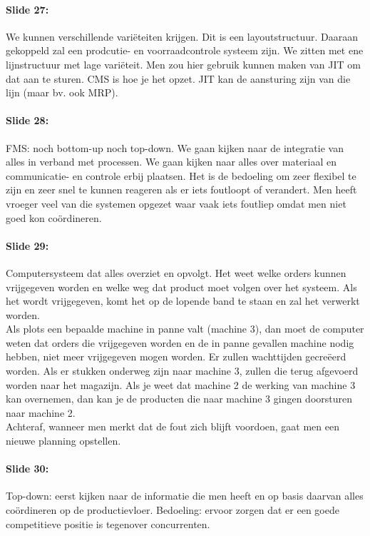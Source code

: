 \documentclass[10pt,a4paper]{report}
\begin{document}
\paragraph{Slide 27:} We kunnen verschillende vari\"eteiten krijgen. Dit is een layoutstructuur. Daaraan gekoppeld zal een prodcutie- en voorraadcontrole systeem zijn. We zitten met ene lijnstructuur met lage vari\"eteit. Men zou hier gebruik kunnen maken van JIT om dat aan te sturen. CMS is hoe je het opzet. JIT kan de aansturing zijn van die lijn (maar bv. ook MRP). 

\paragraph{Slide 28:} FMS: noch bottom-up noch top-down. We gaan kijken naar de integratie van alles in verband met processen. We gaan kijken naar alles over materiaal en communicatie- en controle erbij plaatsen. Het is de bedoeling om zeer flexibel te zijn en zeer snel te kunnen reageren als er iets foutloopt of verandert. Men heeft vroeger veel van die systemen opgezet waar vaak iets foutliep omdat men niet goed kon co\"ordineren.

\paragraph{Slide 29:} Computersysteem dat alles overziet en opvolgt. Het weet welke orders kunnen vrijgegeven worden en welke weg dat product moet volgen over het systeem. Als het wordt vrijgegeven, komt het op de lopende band te staan en zal het verwerkt worden.\\
Als plots een bepaalde machine in panne valt (machine 3), dan moet de computer weten dat orders die vrijgegeven worden en de in panne gevallen machine nodig hebben, niet meer vrijgegeven mogen worden. Er zullen wachttijden gecre\"eerd worden. Als er stukken onderweg zijn naar machine 3, zullen die terug afgevoerd worden naar het magazijn. Als je weet dat machine 2 de werking van machine 3 kan overnemen, dan kan je de producten die naar machine 3 gingen doorsturen naar machine 2.\\
Achteraf, wanneer men merkt dat de fout zich blijft voordoen, gaat men een nieuwe planning opstellen.

\paragraph{Slide 30:} Top-down: eerst kijken naar de informatie die men heeft en op basis daarvan alles co\"ordineren op de productievloer. Bedoeling: ervoor zorgen dat er een goede competitieve positie is tegenover concurrenten.
\end{document}
